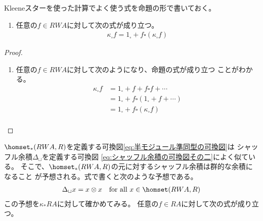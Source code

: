 		Kleeneスターを使った計算でよく使う式を命題の形で書いておく。
		\begin{proposition}[Kleeneスターの性質]\label{prop:Kleeneスターの性質} %
			\begin{enumerate}\setlength{\itemsep}{-1mm} %
				\item 任意の$f\in RWA$に対して次の式が成り立つ。
				\begin{equation}\label{eq:Kleeneスターの性質その一}\begin{split} %
					\kappa_\square f = 1_\square + f\square(\kappa_\square f)
				\end{split}\end{equation} %
			\end{enumerate} %
		\end{proposition} %
		\begin{proof} %
			\begin{enumerate}\setlength{\itemsep}{-1mm} %
				\item 任意の$f\in RWA$に対して次のようになり、命題の式が成り立つ
				ことがわかる。
				\begin{equation*}\begin{split} %
					\kappa_\square f &= 1_\square + f + f\square f + \cdots \\
					&= 1_\square + f\square(1_\square + f + \cdots) \\
					&= 1_\square + f\square(\kappa_\square f) \\
				\end{split}\end{equation*} %
			\end{enumerate} %
		\end{proof} %
		$\homset_*(RWA,R)$を定義する可換図\eqref{eq:半モジュール準同型の可換図}は
		シャッフル余積$\Delta_\sqcup$を定義する可換図
		\eqref{eq:シャッフル余積の可換図その二}によく似ている。
		そこで、$\homset_*(RWA,R)$の元に対するシャッフル余積は群的な余積になること
		が予想される。式で書くと次のような予想である。
		\begin{equation}\label{eq:Kleeneスターのシャッフル余積が群的になること}\begin{split} %
			\Delta_\sqcup x = x\otimes x \quad\text{for all }x\in \homset(RWA,R)
		\end{split}\end{equation} %
		この予想を$\kappa_*RA$に対して確かめてみる。
		任意の$f\in RA$に対して次の式が成り立つ。
